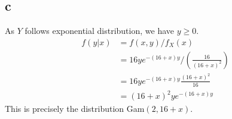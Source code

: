 \documentclass[10pt]{article}
\begin{document}
\subsection*{c}
As $Y$ follows exponential distribution, we have $y\ge0.$
\begin{align*}
    f(y|x) &= f(x,y)/f_X(x)\\
    &= 16ye^{-(16+x)y}/\left(\frac{16}{(16+x)^2}\right)\\
    &= 16ye^{-(16+x)y}\frac{(16+x)^2}{16}\\
    &=(16+x)^2ye^{-(16+x)y}
\end{align*}
This is precisely the distribution Gam$(2,16+x).$
\end{document}
